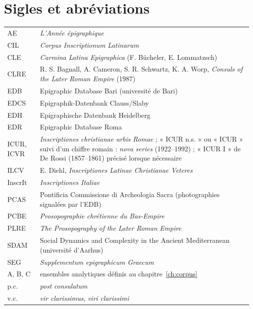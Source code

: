 \chapter*{Sigles et abréviations}
\begin{tabularx}{\linewidth}{@{}l X@{}}
AE & \emph{L’Année épigraphique} \\
CIL & \emph{Corpus Inscriptionum Latinarum} \\
CLE & \emph{Carmina Latina Epigraphica} (F. Bücheler, E. Lommatzsch) \\
CLRE & R. S. Bagnall, A. Cameron, S. R. Schwartz, K. A. Worp, \emph{Consuls of the Later Roman Empire} (1987) \\
EDB & Epigraphic Database Bari (université de Bari) \\
EDCS & Epigraphik-Datenbank Clauss/Slaby \\
EDH & Epigraphische Datenbank Heidelberg \\
EDR & Epigraphic Database Roma \\
ICUR, ICVR & \emph{Inscriptiones christianae urbis Romae} ; « ICUR n.s. » ou « ICUR » suivi d’un chiffre romain : \emph{nova series} (1922–1992) ; « ICUR I » de De Rossi (1857–1861) précisé lorsque nécessaire \\
ILCV & E. Diehl, \emph{Inscriptiones Latinae Christianae Veteres} \\
InscrIt & \emph{Inscriptiones Italiae} \\
PCAS & Pontificia Commissione di Archeologia Sacra (photographies signalées par l’EDB) \\
PCBE & \emph{Prosopographie chrétienne du Bas-Empire} \\
PLRE & \emph{The Prosopography of the Later Roman Empire} \\
SDAM & Social Dynamics and Complexity in the Ancient Mediterranean (université d’Aarhus) \\
SEG & \emph{Supplementum epigraphicum Graecum} \\
\midrule
A, B, C & ensembles analytiques définis au chapitre~\ref{ch:corpus} \\
p.c. & \emph{post consulatum} \\
v.c. & \emph{vir clarissimus}, \emph{viri clarissimi} \\
\end{tabularx}
